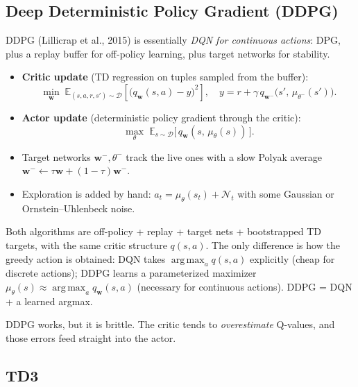 \documentclass[11pt, oneside]{book}
\newcommand{\E}{\mathbb{E}}              %
\newcommand{\argmax}{\operatorname*{arg\,max}}
\begin{document}
\subsection{Deep Deterministic Policy Gradient (DDPG)}

DDPG (Lillicrap et al., 2015) is essentially \emph{DQN for continuous actions}:
DPG, plus a replay buffer for off-policy learning, plus target networks for stability.
\begin{itemize}
  \item \textbf{Critic update} (TD regression on tuples sampled from the buffer):
  \[
    \min_\mathbf{w}\; \E_{(s,a,r,s') \sim \mathcal{D}}\!\left[\bigl(q_\mathbf{w}(s,a) - y\bigr)^2\right],
    \quad y = r + \gamma\, q_{\mathbf{w}^-}\!\bigl(s',\, \mu_{\theta^-}(s')\bigr).
  \]
  \item \textbf{Actor update} (deterministic policy gradient through the critic):
  \[
    \max_\theta\; \E_{s \sim \mathcal{D}}\bigl[\, q_\mathbf{w}(s,\, \mu_\theta(s))\, \bigr].
  \]
  \item Target networks $\mathbf{w}^-, \theta^-$ track the live ones with a slow Polyak
    average $\mathbf{w}^- \leftarrow \tau \mathbf{w} + (1-\tau)\mathbf{w}^-$.
  \item Exploration is added by hand: $a_t = \mu_\theta(s_t) + \mathcal{N}_t$ with some
    Gaussian or Ornstein--Uhlenbeck noise.
\end{itemize}

\begin{intbox}[title={DQN $\leftrightarrow$ DDPG correspondence}]
Both algorithms are off-policy + replay + target nets + bootstrapped TD targets, with
the same critic structure $q(s,a)$. The only difference is how the greedy action is
obtained: DQN takes $\argmax_a q(s,a)$ explicitly (cheap for discrete actions);
DDPG learns a parameterized maximizer $\mu_\theta(s) \approx \argmax_a q_\mathbf{w}(s,a)$
(necessary for continuous actions). DDPG = DQN + a learned argmax.
\end{intbox}

DDPG works, but it is brittle. The critic tends to \emph{overestimate} Q-values, and
those errors feed straight into the actor.

\subsection{TD3}
\end{document}
